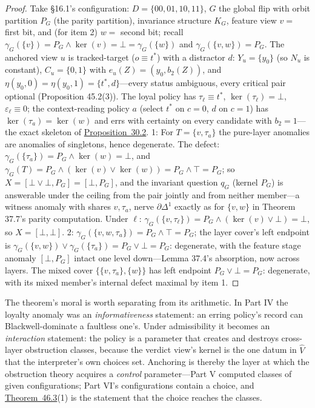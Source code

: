 \begin{proof}

Take §16.1's configuration: \(D = \{00, 01, 10, 11\}\), \(G\) the global flip with orbit partition \(P_G\) (the parity partition), invariance structure \(K_G\), feature view \(v =\) first bit, and (for item 2) \(w =\) second bit; recall \(\gamma_G(\{v\}) = P_G \wedge \ker(v) = \bot = \gamma_G(\{w\})\) and \(\gamma_G(\{v,w\}) = P_G\). The anchored view \(u\) is tracked-target (\(o \equiv t^*\)) with a distractor \(d\): \(Y_u = \{y_0\}\) (so \(N_u\) is constant), \(C_u = \{0,1\}\) with \(e_u(Z) = (y_0, b_2(Z))\), and \(\eta(y_0, 0) = \eta(y_0, 1) = \{t^*, d\}\)---\hspace{0pt}every status ambiguous, every critical pair optional (Proposition 45.2(3)). The loyal policy has \(\tau_\ell \equiv t^*\), \(\ker(\tau_\ell) = \bot\), \(\varepsilon_\ell \equiv 0\); the context-reading policy \(a\) (select \(t^*\) on \(c = 0\), \(d\) on \(c = 1\)) has \(\ker(\tau_a) = \ker(w)\) and errs with certainty on every candidate with \(b_2 = 1\)---\hspace{0pt}the exact skeleton of \hyperlink{stmt:30.2}{Proposition~30.2}.
1: For \(T = \{v, \tau_a\}\) the pure-layer anomalies are anomalies of singletons, hence degenerate. The defect: \(\gamma_G(\{\tau_a\}) = P_G \wedge \ker(w) = \bot\), and \(\gamma_G(T) = P_G \wedge (\ker(v) \vee \ker(w)) = P_G \wedge \top = P_G\); so \(X = [\bot \vee \bot, P_G] = [\bot, P_G]\), and the invariant question \(q_G\) (kernel \(P_G\)) is answerable under the ceiling from the pair jointly and from neither member---\hspace{0pt}a witness anomaly with shares \(v, \tau_a\), nerve \(\partial\Delta^1\) exactly as for \(\{v, w\}\) in Theorem 37.7's parity computation. Under \(\ell\): \(\gamma_G(\{v, \tau_\ell\}) = P_G \wedge (\ker(v) \vee \bot) = \bot\), so \(X = [\bot, \bot]\).
2: \(\gamma_G(\{v,w,\tau_a\}) = P_G \wedge \top = P_G\); the layer cover's left endpoint is \(\gamma_G(\{v,w\}) \vee \gamma_G(\{\tau_a\}) = P_G \vee \bot = P_G\): degenerate, with the feature stage anomaly \([\bot, P_G]\) intact one level down---\hspace{0pt}Lemma 37.4's absorption, now across layers. The mixed cover \(\{\{v,\tau_a\},\{w\}\}\) has left endpoint \(P_G \vee \bot = P_G\): degenerate, with its mixed member's internal defect maximal by item 1.
\end{proof}

The theorem's moral is worth separating from its arithmetic. In Part IV the loyalty anomaly was an \emph{informativeness} statement: an erring policy's record can Blackwell-dominate a faultless one's. Under admissibility it becomes an \emph{interaction} statement: the policy is a parameter that creates and destroys cross-layer obstruction classes, because the verdict view's kernel is the one datum in \(\widehat{V}\) that the interpreter's own choices set. Anchoring is thereby the layer at which the obstruction theory acquires a \emph{control} parameter---\hspace{0pt}Part V computed classes of given configurations; Part VI's configurations contain a choice, and \hyperlink{stmt:46.3}{Theorem~46.3}(1) is the statement that the choice reaches the classes.

